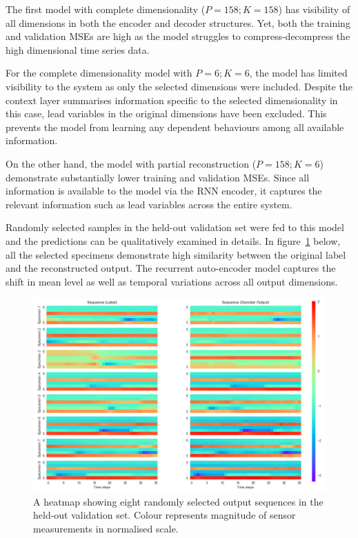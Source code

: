 \documentclass[runningheads]{llncs}
\begin{document}
The first model with complete dimensionality (\(P=158; K=158\)) has visibility of all dimensions in both the encoder and decoder structures. Yet, both the training and validation MSEs are high as the model struggles to compress-decompress the high dimensional time series data.

For the complete dimensionality model with \(P=6; K=6\), the model has limited visibility to the system as only the selected dimensions were included. Despite the context layer summarises information specific to the selected dimensionality in this case, lead variables in the original dimensions have been excluded. This prevents the model from learning any dependent behaviours among all available information.

On the other hand, the model with partial reconstruction (\(P=158; K=6\)) demonstrate substantially lower training and validation MSEs. Since all information is available to the model via the RNN encoder, it captures the relevant information such as lead variables across the entire system. 

Randomly selected samples in the held-out validation set were fed to this model and the predictions can be qualitatively examined in details. In figure~\ref{fig:heatmaps} below, all the selected specimens demonstrate high similarity between the original label and the reconstructed output. The recurrent auto-encoder model captures the shift in mean level as well as temporal variations across all output dimensions. 

\begin{figure}[H]
	\centering
	\includegraphics[width=.8\textwidth]{heatmaps.PNG}
	\caption{A heatmap showing eight randomly selected output sequences in the held-out validation set. Colour represents magnitude of sensor measurements in normalised scale.}
	\label{fig:heatmaps}
\end{figure}
\end{document}
